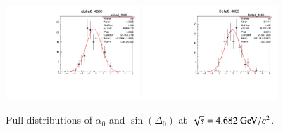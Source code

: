 \begin{figure}[h]\centering
    \includegraphics[width=0.45\textwidth]{figure/io_full_sim/polarization/pull_polarization_alpha0_4680.pdf}
    \includegraphics[width=0.45\textwidth]{figure/io_full_sim/polarization/pull_polarization_delta0_4680.pdf}
    \caption{Pull distributions of $\alpha_0$ and $\sin(\Delta_0)$ at $\sqrt{s} = 4.682\gev/c^2$.}
\label{fig:io_full_sim_pull_alpha0}
\end{figure}

